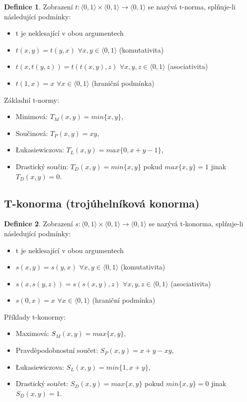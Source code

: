 \documentclass[a4]{report}
\theoremstyle{definition}
\newtheorem{definition}{Definice}[section]
\begin{document}
{\begin{definition}
Zobrazení $t:\langle 0,1\rangle \times \langle 0,1\rangle \rightarrow \langle 0,1\rangle$ se nazývá t-norma, splňuje-li následující podmínky:

\begin{itemize}
\item  t je neklesající v obou argumentech
\item  $t(x,y)=t(y,x)$  $\forall x,y\in \langle 0,1 \rangle$ (komutativita)
\item  $t(x,t(y,z))=t(t(x,y),z) $  $\forall x,y,z\in \langle 0,1 \rangle$ (asociativita)
\item $t(1,x)=x$  $\forall x\in \langle 0,1 \rangle$ (hraniční podmínka)
\end{itemize}
\end{definition}

Základní t-normy:
\begin{itemize}
\item Minimová: $T_M (x,y)=min\{x,y\}$,
\item Součinová: $T_P (x,y)=xy$,
\item Łukasiewiczova: $T_L (x,y)=max\{0,x+y-1\}$,
\item Drastický součin: $T_D(x,y)=min\{x,y\}$ pokud $max\{x,y\}=1$ jinak $T_D(x,y)=0$.
\end{itemize}



\subsection{T-konorma (trojúhelníková konorma)}

\begin{definition}
Zobrazení $s:\langle 0,1\rangle \times \langle 0,1\rangle \rightarrow \langle 0,1\rangle$ se nazývá t-konorma, splňuje-li následující podmínky:
\begin{itemize}
\item  t je neklesající v obou argumentech
\item  $s(x,y)=s(y,x)$  $\forall x,y\in \langle 0,1 \rangle$ (komutativita)
\item  $s(x,s(y,z))=s(s(x,y),z) $  $\forall x,y,z\in \langle 0,1 \rangle$ (asociativita)
\item $s(0,x)=x$  $\forall x\in \langle 0,1 \rangle$ (hraniční podmínka)
\end{itemize}
\end{definition}

Příklady t-konormy:
\begin{itemize}
\item Maximová: $S_M (x,y)=max\{x,y\}$, 
\item Pravděpodobnostní součet: $S_P(x,y)=x+y-xy$, 
\item Łukasiewiczova: $S_L (x,y)=min\{1,x+y\}$,
\item Drastický součet: $S_D(x,y)=max\{x,y\}$ pokud $min\{x,y\}=0$ jinak $S_D(x,y)=1$.
\end{itemize}






}
\end{document}
